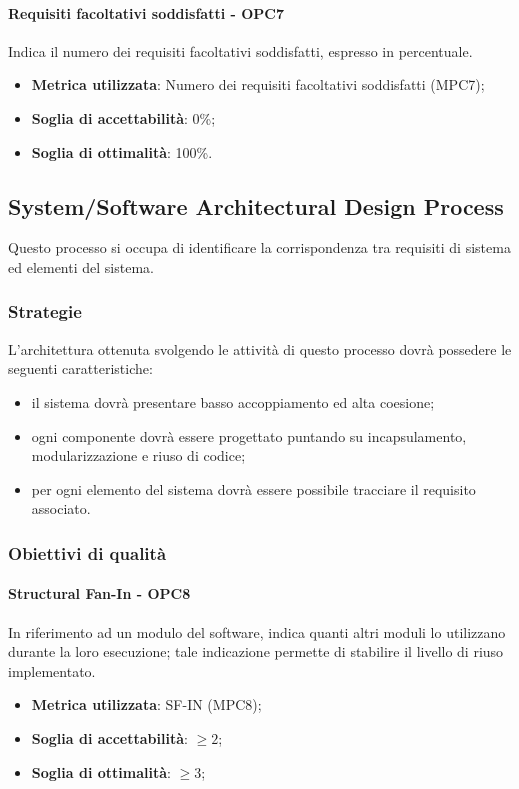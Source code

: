 \documentclass[PdQ.tex]{subfiles}
\begin{document}
			\paragraph{Requisiti facoltativi soddisfatti - OPC7}
			Indica il numero dei requisiti facoltativi soddisfatti, espresso in percentuale.
			\begin{itemize}
					\item \textbf{Metrica utilizzata}: Numero dei requisiti facoltativi soddisfatti (MPC7);
					\item \textbf{Soglia di accettabilità}: 0\%;
					\item \textbf{Soglia di ottimalità}: 100\%.
			\end{itemize}
		
	\subsection{System/Software Architectural Design Process}
		Questo processo si occupa di identificare la corrispondenza tra requisiti di sistema ed elementi del sistema.
		
		\subsubsection{Strategie}
		L'architettura ottenuta svolgendo le attività di questo processo dovrà possedere le seguenti caratteristiche:
		\begin{itemize}
		\item il sistema dovrà presentare basso accoppiamento ed alta coesione;
		\item ogni componente dovrà essere progettato puntando su incapsulamento, modularizzazione e riuso di codice;
		\item per ogni elemento del sistema dovrà essere possibile tracciare il requisito associato.
		\end{itemize}
		
		\subsubsection{Obiettivi di qualità}
			\paragraph{Structural Fan-In - OPC8}
			In riferimento ad un modulo del software, indica quanti altri moduli lo utilizzano durante la
			loro esecuzione; tale indicazione permette di stabilire il livello di riuso implementato. 
			\begin{itemize}
					\item \textbf{Metrica utilizzata}: SF-IN (MPC8);
					\item \textbf{Soglia di accettabilità}: \begin{math}\geq 2\end{math};
					\item \textbf{Soglia di ottimalità}: \begin{math}\geq 3\end{math};
			\end{itemize}
\end{document}
